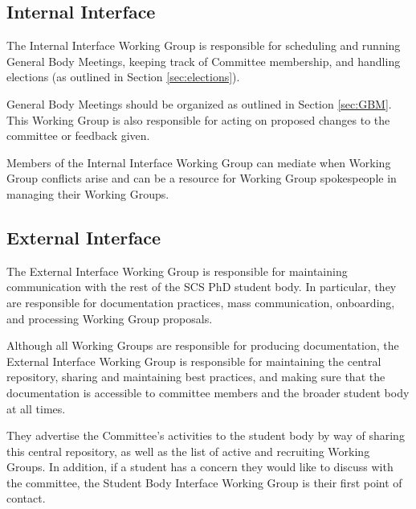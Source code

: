 \documentclass{article}
\begin{document}
\subsection{Internal Interface} %

The Internal Interface Working Group is responsible for scheduling and running General Body Meetings, keeping track of Committee membership, and handling elections (as outlined in Section \ref{sec:elections}).

General Body Meetings should be organized as outlined in Section \ref{sec:GBM}. This Working Group is also responsible for acting on proposed changes to the committee or feedback given.

Members of the Internal Interface Working Group can mediate when Working Group conflicts arise and can be a resource for Working Group spokespeople in managing their Working Groups.


\subsection{External Interface} %

The External Interface Working Group is responsible for maintaining communication with the rest of the SCS PhD student body. In particular, they are responsible for documentation practices, mass communication, onboarding, and processing Working Group proposals. 

Although all Working Groups are responsible for producing documentation, the External Interface Working Group is responsible for maintaining the central repository, sharing and maintaining best practices, and making sure that the documentation is accessible to committee members and the broader student body at all times. 

They advertise the Committee's activities to the student body by way of sharing this central repository, as well as the list of active and recruiting Working Groups. In addition, if a student has a concern they would like to discuss with the committee, the Student Body Interface Working Group is their first point of contact.
\end{document}
